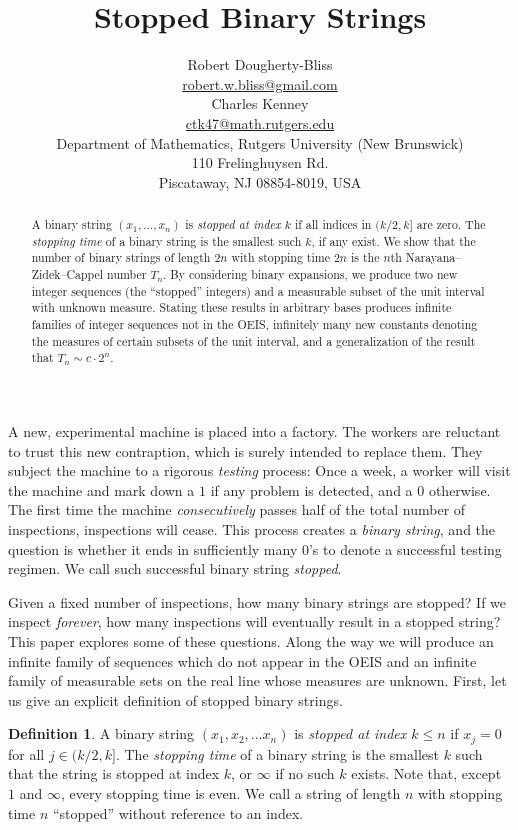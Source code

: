 \documentclass[12pt]{article}
\title{Stopped Binary Strings}
\date{}
\author{Robert Dougherty-Bliss \\
    \href{mailto:robert.w.bliss@gmail.com}{robert.w.bliss@gmail.com} \\
    Charles Kenney \\
    \href{mailto:ctk47@math.rutgers.edu}{ctk47@math.rutgers.edu} \\
    Department of Mathematics, Rutgers University (New Brunswick) \\
    110 Frelinghuysen Rd. \\
    Piscataway, NJ 08854-8019, USA
}
\theoremstyle{definition}
\newtheorem{definition}{Definition}
\begin{document}
\maketitle

\begin{abstract}
    A binary string $(x_1, \dots, x_n)$ is \emph{stopped at index $k$} if all
    indices in $(k / 2, k]$ are zero. The \emph{stopping time} of a binary
    string is the smallest such $k$, if any exist. We show that the number of
    binary strings of length $2n$ with stopping time $2n$ is the $n$th
    Narayana--Zidek--Cappel number $T_n$. By considering binary expansions, we
    produce two new integer sequences (the ``stopped'' integers) and a
    measurable subset of the unit interval with unknown measure. Stating these
    results in arbitrary bases produces infinite families of integer sequences
    not in the OEIS, infinitely many new constants denoting the measures of
    certain subsets of the unit interval, and a generalization of the result
    that $T_n \sim c \cdot 2^n$.
\end{abstract}

\noindent A new, experimental machine is placed into a factory. The workers are
reluctant to trust this new contraption, which is surely intended to replace
them. They subject the machine to a rigorous \emph{testing} process: Once a
week, a worker will visit the machine and mark down a $1$ if any problem is
detected, and a $0$ otherwise. The first time the machine \emph{consecutively}
passes half of the total number of inspections, inspections will cease. This
process creates a \emph{binary string}, and the question is whether it ends in
sufficiently many $0$'s to denote a successful testing regimen. We call such
successful binary string \emph{stopped}.

Given a fixed number of inspections, how many binary strings are stopped? If we
inspect \emph{forever}, how many inspections will eventually result in a
stopped string? This paper explores some of these questions. Along the way we
will produce an infinite family of sequences which do not appear in the OEIS
and an infinite family of measurable sets on the real line whose measures are
unknown. First, let us give an explicit definition of stopped binary strings.

\begin{definition}
    A binary string $(x_1, x_2, \dots x_n)$ is \emph{stopped at index $k \leq
    n$} if $x_j = 0$ for all $j \in (k / 2, k]$. The \emph{stopping time} of a
    binary string is the smallest $k$ such that the string is stopped at index
    $k$, or $\infty$ if no such $k$ exists. Note that, except $1$ and $\infty$,
    every stopping time is even. We call a string of length $n$ with stopping
    time $n$ ``stopped'' without reference to an index.
\end{definition}
\end{document}
